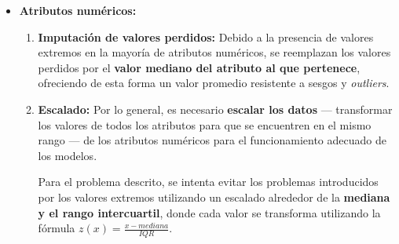 \begin{itemize}[leftmargin=*, parsep=1pt, itemsep=1pt, topsep=4pt]
	\item \textbf{Atributos numéricos:}
	
	\begin{enumerate}
		\item \textbf{Imputación de valores perdidos:} Debido a la presencia de valores extremos en la mayoría de atributos numéricos, se reemplazan los valores perdidos por el \textbf{valor mediano del atributo al que pertenece}, ofreciendo de esta forma un valor promedio resistente a sesgos y \textit{outliers}.
		\item \textbf{Escalado:} Por lo general, es necesario \textbf{escalar los datos} --- transformar los valores de todos los atributos para que se encuentren en el mismo rango --- de los atributos numéricos para el funcionamiento adecuado de los modelos.
		
		Para el problema descrito, se intenta evitar los problemas introducidos por los valores extremos utilizando un escalado alrededor de la \textbf{mediana y el rango intercuartil}, donde cada valor se transforma utilizando la fórmula $z(x) = \frac{x - mediana}{IQR}$. 
	\end{enumerate}
\end{itemize}